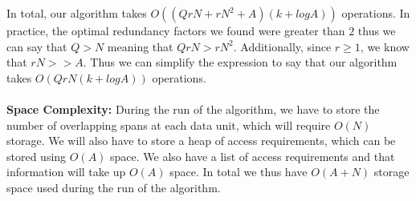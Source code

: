 In total, our algorithm takes $O((QrN + rN^2 + A)(k + logA))$ operations. In practice, the optimal redundancy factors we found were greater than $2$ thus we can say that $Q > N$ meaning that $QrN > rN^2$. Additionally, since $r \geq 1$, we know that $rN > > A$. Thus we can simplify the expression to say that our algorithm takes $O(QrN(k + logA))$ operations. \\
\\
{\bf Space Complexity:} During the run of the algorithm, we have to store the number of overlapping spans at each data unit, which will require $O(N)$ storage. We will also have to store a heap of access requirements, which can be stored using $O(A)$ space. We also have a list of access requirements and that information will take up $O(A)$ space. In total we thus have $O(A + N)$ storage space used during the run of the algorithm. 